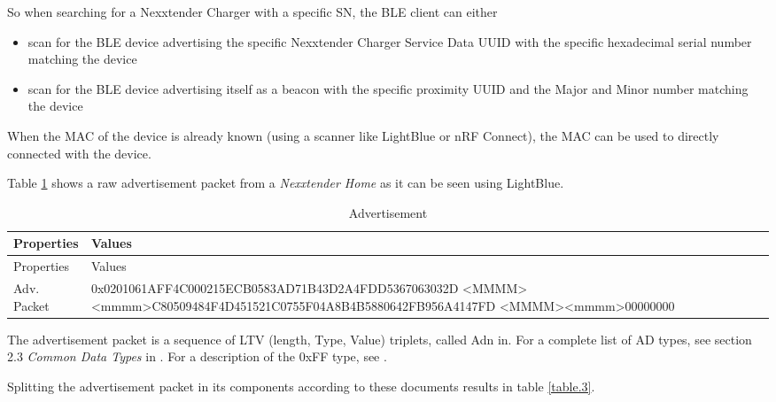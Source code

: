 \documentclass[a4paper]{article}
\begin{document}
So when searching for a Nexxtender Charger with a specific SN, the BLE client can either

\begin{itemize}
	
	\item
	      scan for the BLE device advertising the specific Nexxtender Charger
	      Service Data UUID with the specific hexadecimal serial number matching
	      the device
	\item
	      scan for the BLE device advertising itself as a beacon with the
	      specific proximity UUID and the Major and Minor number matching the
	      device
\end{itemize}

When the MAC of the device is already known (using a scanner like LightBlue or nRF Connect), 
the MAC can be used to directly connected with the device.

Table \ref{table.2} shows a raw advertisement packet from a 
\emph{Nexxtender Home} as it can be seen using LightBlue.

\begin{longtable}[]{p{2cm}   p{14cm}}
	\caption{Advertisement}
	\label{table.2}
	\tabularnewline
	\toprule\noalign{}
	Properties  & Values \\
	\midrule\noalign{}
	\endfirsthead
	\toprule\noalign{}
	Properties  & Values \\
	\midrule\noalign{}
	\endhead
	\bottomrule\noalign{}
	\endlastfoot
	Adv. Packet &        
	0x0201061AFF4C000215ECB0583AD71B43D2A4FDD5367063032D \textless MMMM\textgreater \textless mmmm\textgreater C80509484F4D451521C0755F04A8B4B5880642FB956A4147FD \textless MMMM\textgreater\textless mmmm\textgreater00000000 \\
\end{longtable}

The advertisement packet is a sequence of LTV (length, Type, Value) triplets, 
called Adn in\cite{NSBLE}. 
For a complete list of AD types, see section 2.3 \emph{Common Data Types} in \cite{BLSAN}. 
For a description of the 0xFF type, see \cite{KIIB}.

Splitting the advertisement packet in its components according to these
documents results in table \ref{table.3}.
\end{document}
